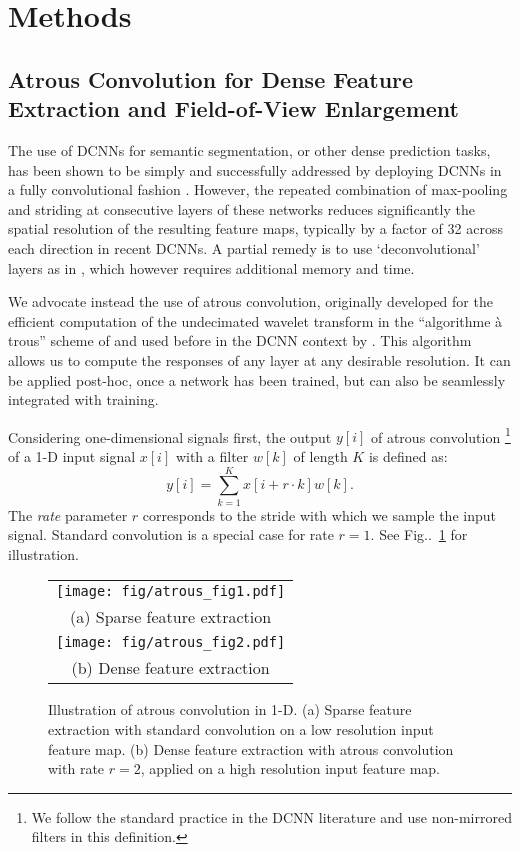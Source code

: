 \documentclass[10pt,journal,compsoc]{IEEEtran}
\makeatletter
\newcommand{\figref}[1]{Fig\onedot~\ref{#1}}
\def\onedot{\ifx\@let@token.\else.\null\fi\xspace}
\makeatother
\begin{document}
 \section{Methods}
\label{sec:methods}

\subsection{Atrous Convolution for Dense Feature Extraction and Field-of-View Enlargement}
\label{sec:convnet-hole}
The use of DCNNs for semantic segmentation, or other dense prediction tasks, has been shown to be
simply and successfully addressed by deploying DCNNs in a fully convolutional fashion \cite{sermanet2013overfeat, long2014fully}.
 However, the repeated combination of max-pooling and striding
 at consecutive layers of these networks reduces significantly the spatial resolution of the
 resulting feature maps, typically by a factor of 32 across each direction in recent DCNNs.
 A partial remedy is to use `deconvolutional' layers as  in  \cite{long2014fully},
which however requires additional memory and time.
 
We advocate instead the use of atrous convolution, originally developed for the efficient computation of the
undecimated wavelet transform in the ``algorithme \`a trous'' scheme of
\cite{holschneider1989real} and used before in the DCNN context by
\cite{giusti2013fast, sermanet2013overfeat, papandreou2014untangling}.
This algorithm allows us to compute the responses of any layer at any desirable resolution.
It can be applied post-hoc, once a network has been trained, but can also be seamlessly integrated with training.

Considering one-dimensional signals first, the output $y[i]$ of atrous convolution \footnote{We follow the
standard practice in the DCNN literature and use non-mirrored filters in this
definition.} of a 1-D input signal $x[i]$ with a filter $w[k]$ of length $K$ is
defined as:
\begin{equation}
  y[i] = \sum_{k=1}^K x[i + r \cdot k] w[k].
\end{equation}
The \emph{rate} parameter $r$ corresponds to the stride with which we sample the
input signal. Standard convolution is a special case for rate $r = 1$.
See \figref{fig:hole} for illustration.

 \begin{figure}
  \begin{tabular}{c}
\texttt{[image: fig/atrous\_fig1.pdf]} \\
    {\scriptsize (a) Sparse feature extraction} \\
    \texttt{[image: fig/atrous\_fig2.pdf]} \\
    {\scriptsize (b) Dense feature extraction} \\
  \end{tabular}
  \caption{Illustration of atrous convolution in 1-D. (a) Sparse feature
    extraction with standard convolution on a low resolution input feature map.
    (b) Dense feature extraction with atrous convolution with rate $r = 2$,
    applied on a high resolution input feature map.}
  \label{fig:hole}
\end{figure}
\end{document}
